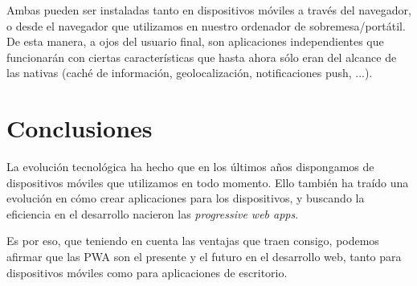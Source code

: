 \documentclass{\ClassPath/viu-tfm-template}
\begin{document}
Ambas pueden ser instaladas tanto en dispositivos móviles a través del navegador, o desde el navegador que utilizamos en nuestro ordenador de sobremesa/portátil. De esta manera, a ojos del usuario final, son aplicaciones independientes que funcionarán con ciertas características que hasta ahora sólo eran del alcance de las nativas (caché de información, geolocalización, notificaciones push, ...).

\chapter{Conclusiones}
La evolución tecnológica ha hecho que en los últimos años dispongamos de dispositivos móviles que utilizamos en todo momento. Ello también ha traído una evolución en cómo crear aplicaciones para los dispositivos, y buscando la eficiencia en el desarrollo nacieron las \textit{progressive web apps}.

Es por eso, que teniendo en cuenta las ventajas que traen consigo, podemos afirmar que las PWA son el presente y el futuro en el desarrollo web, tanto para dispositivos móviles como para aplicaciones de escritorio.

\printbibliography[title={Referencias bibliográficas},heading=bibintoc]
\end{document}
